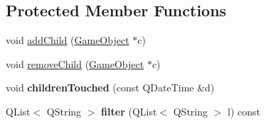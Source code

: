 \subsection*{\-Protected \-Member \-Functions}
\begin{DoxyCompactItemize}
\item 
void \hyperlink{class_game_object_a4733a1081db3c2d0a9be225265283ad8}{add\-Child} (\hyperlink{class_game_object}{\-Game\-Object} $\ast$c)
\item 
void \hyperlink{class_game_object_a21dc679cb474b147b7d7d336117ffe58}{remove\-Child} (\hyperlink{class_game_object}{\-Game\-Object} $\ast$c)
\item 
\hypertarget{class_game_object_a4e57d5a3f8be6882e5d7f2a2e5d45ccd}{void {\bfseries children\-Touched} (const \-Q\-Date\-Time \&d)}\label{class_game_object_a4e57d5a3f8be6882e5d7f2a2e5d45ccd}

\item 
\hypertarget{class_game_object_a05c00e0f34a146c91275fb67ce62dfcf}{\-Q\-List$<$ \-Q\-String $>$ {\bfseries filter} (\-Q\-List$<$ \-Q\-String $>$ l) const }\label{class_game_object_a05c00e0f34a146c91275fb67ce62dfcf}

\end{DoxyCompactItemize}
